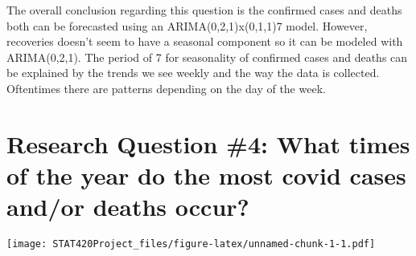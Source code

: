 \documentclass[]{article}
\newenvironment{Shaded}{\begin{snugshade}}{\end{snugshade}}
\newcommand{\CommentTok}[1]{\textcolor[rgb]{0.56,0.35,0.01}{\textit{#1}}}
\newcommand{\DataTypeTok}[1]{\textcolor[rgb]{0.13,0.29,0.53}{#1}}
\newcommand{\KeywordTok}[1]{\textcolor[rgb]{0.13,0.29,0.53}{\textbf{#1}}}
\newcommand{\NormalTok}[1]{#1}
\newcommand{\OperatorTok}[1]{\textcolor[rgb]{0.81,0.36,0.00}{\textbf{#1}}}
\newcommand{\StringTok}[1]{\textcolor[rgb]{0.31,0.60,0.02}{#1}}
\begin{document}
The overall conclusion regarding this question is the confirmed cases
and deaths both can be forecasted using an ARIMA(0,2,1)x(0,1,1)7 model.
However, recoveries doesn't seem to have a seasonal component so it can
be modeled with ARIMA(0,2,1). The period of 7 for seasonality of
confirmed cases and deaths can be explained by the trends we see weekly
and the way the data is collected. Oftentimes there are patterns
depending on the day of the week.

\hypertarget{research-question-4-what-times-of-the-year-do-the-most-covid-cases-andor-deaths-occur}{%
\section{Research Question \#4: What times of the year do the most covid
cases and/or deaths
occur?}\label{research-question-4-what-times-of-the-year-do-the-most-covid-cases-andor-deaths-occur}}

\begin{Shaded}
\end{Shaded}

\texttt{[image: STAT420Project\_files/figure-latex/unnamed-chunk-1-1.pdf]}

\begin{Shaded}
\end{Shaded}
\end{document}
